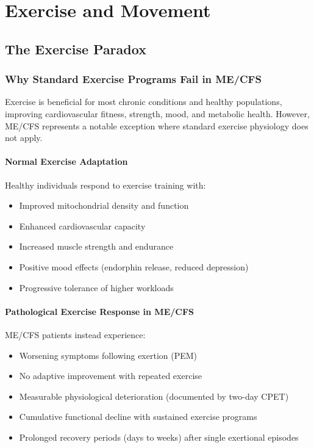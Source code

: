 \section{Exercise and Movement}
\label{sec:exercise}

\subsection{The Exercise Paradox}

\subsubsection{Why Standard Exercise Programs Fail in ME/CFS}

Exercise is beneficial for most chronic conditions and healthy populations, improving cardiovascular fitness, strength, mood, and metabolic health. However, ME/CFS represents a notable exception where standard exercise physiology does not apply.

\paragraph{Normal Exercise Adaptation}
Healthy individuals respond to exercise training with:
\begin{itemize}
    \item Improved mitochondrial density and function
    \item Enhanced cardiovascular capacity
    \item Increased muscle strength and endurance
    \item Positive mood effects (endorphin release, reduced depression)
    \item Progressive tolerance of higher workloads
\end{itemize}

\paragraph{Pathological Exercise Response in ME/CFS}
ME/CFS patients instead experience:
\begin{itemize}
    \item Worsening symptoms following exertion (PEM)
    \item No adaptive improvement with repeated exercise
    \item Measurable physiological deterioration (documented by two-day CPET)
    \item Cumulative functional decline with sustained exercise programs
    \item Prolonged recovery periods (days to weeks) after single exertional episodes
\end{itemize}

